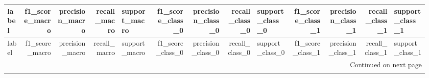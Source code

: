 \usepackage{booktabs}
\usepackage{longtable}
\begin{longtable}{lrrrlrrrlrrrl}
\toprule
                             label &  f1_score_macro &  precision_macro &  recall_macro & support_macro &  f1_score_class_0 &  precision_class_0 &  recall_class_0 & support_class_0 &  f1_score_class_1 &  precision_class_1 &  recall_class_1 & support_class_1 \\
\midrule
\endfirsthead

\toprule
                             label &  f1_score_macro &  precision_macro &  recall_macro & support_macro &  f1_score_class_0 &  precision_class_0 &  recall_class_0 & support_class_0 &  f1_score_class_1 &  precision_class_1 &  recall_class_1 & support_class_1 \\
\midrule
\endhead
\midrule
\multicolumn{13}{r}{{Continued on next page}} \\
\midrule
\endfoot


\end{longtable}
